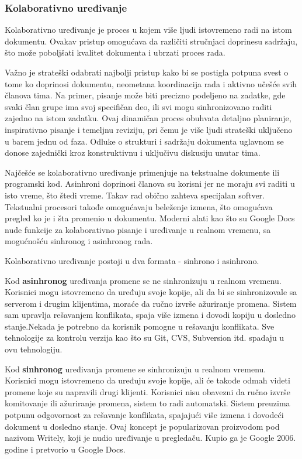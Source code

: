 \documentclass[12pt]{article}
\begin{document}
\subsubsection{Kolaborativno uređivanje}

Kolaborativno uređivanje je proces u kojem više ljudi istovremeno radi na istom dokumentu. Ovakav pristup omogućava da različiti stručnjaci doprinesu sadržaju, što može poboljšati kvalitet dokumenta i ubrzati proces rada.

Važno je strateški odabrati najbolji pristup kako bi se postigla potpuna svest o tome ko doprinosi dokumentu, neometana koordinacija rada i aktivno učešće svih članova tima. Na primer, pisanje može biti precizno podeljeno na zadatke, gde svaki član grupe ima svoj specifičan deo, ili svi mogu sinhronizovano raditi zajedno na istom zadatku. Ovaj dinamičan proces obuhvata detaljno planiranje, inspirativno pisanje i temeljnu reviziju, pri čemu je više ljudi strateški uključeno u barem jednu od faza. Odluke o strukturi i sadržaju dokumenta uglavnom se donose zajednički kroz konstruktivnu i uključivu diskusiju unutar tima.
    
Najčešće se kolaborativno uređivanje primenjuje na tekstualne dokumente ili programski kod. Asinhroni doprinosi članova su korisni jer ne moraju svi raditi u isto vreme, što štedi vreme. Takav rad obično zahteva specijalan softver. Tekstualni procesori takođe omogućavaju beleženje izmena, što omogućava pregled ko je i šta promenio u dokumentu. Moderni alati kao što su Google Docs nude funkcije za kolaborativno pisanje i uređivanje u realnom vremenu, sa mogućnošću sinhronog i asinhronog rada.

Kolaborativno uređivanje postoji u dva formata - sinhrono i asinhrono.

Kod \textbf{asinhronog} uređivanja promene se ne sinhronizuju u realnom vremenu. Korisnici mogu istovremeno da uređuju svoje kopije, ali da bi se sinhronizovale sa serverom i drugim klijentima, moraće da ručno izvrše ažuriranje promena. Sistem sam upravlja rešavanjem konflikata, spaja više izmena i dovodi kopiju u dosledno stanje.Nekada je potrebno da korisnik pomogne u rešavanju konflikata. Sve tehnologije za kontrolu verzija kao što su Git, CVS, Subversion itd. spadaju u ovu tehnologiju.

Kod \textbf{sinhronog} uređivanja promene se sinhronizuju u realnom vremenu. Korisnici mogu istovremeno da uređuju svoje kopije, ali će takođe odmah videti promene koje su napravili drugi klijenti. Korisnici nisu obavezni da ručno izvrše komitovanje ili ažuriranje promena, sistem to radi automatski. Sistem preuzima potpunu odgovornost za rešavanje konflikata, spajajući više izmena i dovodeći dokument u dosledno stanje. Ovaj koncept je popularizovan proizvodom pod nazivom Writely, koji je nudio uređivanje u pregledaču. Kupio ga je Google 2006. godine i pretvorio u Google Docs.
    
\end{document}
